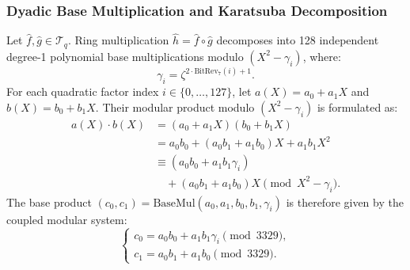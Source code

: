 \subsubsection{Dyadic Base Multiplication and Karatsuba Decomposition}
Let $\hat{f}, \hat{g} \in \mathcal{T}_q$. Ring multiplication $\hat{h} = \hat{f} \circ \hat{g}$ decomposes into 128 independent degree-1 polynomial base multiplications modulo $(X^2 - \gamma_i)$, where:
\begin{equation}
\label{eq:gamma_twiddle}
\gamma_i = \zeta^{2\cdot\text{BitRev}_7(i) + 1}.
\end{equation}
For each quadratic factor index $i \in \{0, \dots, 127\}$, let $a(X) = a_0 + a_1 X$ and $b(X) = b_0 + b_1 X$. Their modular product modulo $(X^2 - \gamma_i)$ is formulated as:
\begin{align}
\label{eq:basemul_derivation}
a(X) \cdot b(X) &= (a_0 + a_1 X)(b_0 + b_1 X) \nonumber \\
&= a_0 b_0 + (a_0 b_1 + a_1 b_0) X + a_1 b_1 X^2 \nonumber \\
&\equiv (a_0 b_0 + a_1 b_1 \gamma_i) \nonumber \\
&\quad + (a_0 b_1 + a_1 b_0) X \pmod{X^2 - \gamma_i}.
\end{align}
The base product $(c_0, c_1) = \text{BaseMul}(a_0, a_1, b_0, b_1, \gamma_i)$ is therefore given by the coupled modular system:
\begin{equation}
\label{eq:basemul_system}
\begin{cases}
c_0 = a_0 b_0 + a_1 b_1 \gamma_i \pmod{3329}, \\
c_1 = a_0 b_1 + a_1 b_0 \pmod{3329}.
\end{cases}
\end{equation}

